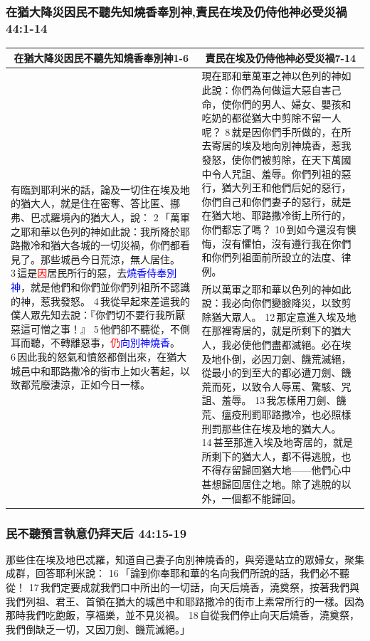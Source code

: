 \subsubsection{在猶大降災因民不聽先知燒香奉別神,責民在埃及仍侍他神必受災禍 44:1-14}
\begin{table}[H]
\centering
\begin{tabular}{p{6cm}|p{11.250cm}}\hline\hline
\multicolumn{1}{c|}{在猶大降災因民不聽先知燒香奉別神1-6}&\multicolumn{1}{c}{責民在埃及仍侍他神必受災禍7-14}\\\hline
\multirow{2}{6.26cm}{有臨到耶利米的話，論及一切住在埃及地的猶大人，就是住在密奪、答比匿、挪弗、巴忒羅境內的猶大人，說： 2 「萬軍之耶和華以色列的神如此說：我所降於耶路撒冷和猶大各城的一切災禍，你們都看見了。那些城邑今日荒涼，無人居住。 3 這是\textcolor{red}{因}居民所行的惡，去\textcolor{blue}{燒香侍奉別神}，就是他們和你們並你們列祖所不認識的神，惹我發怒。 4 我從早起來差遣我的僕人眾先知去說：『你們切不要行我所厭惡這可憎之事！』 5 他們卻不聽從，不側耳而聽，不轉離惡事，\textcolor{red}{仍}\textcolor{blue}{向別神燒香}。 6 因此我的怒氣和憤怒都倒出來，在猶大城邑中和耶路撒冷的街市上如火著起，以致都荒廢淒涼，正如今日一樣。}
&現在耶和華萬軍之神以色列的神如此說：你們為何做這大惡自害己命，使你們的男人、婦女、嬰孩和吃奶的都從猶大中剪除不留一人呢？ 8 就是因你們手所做的，在所去寄居的埃及地向別神燒香，惹我發怒，使你們被剪除，在天下萬國中令人咒詛、羞辱。你們列祖的惡行，猶大列王和他們后妃的惡行，你們自己和你們妻子的惡行，就是在猶大地、耶路撒冷街上所行的，你們都忘了嗎？ 10 到如今還沒有懊悔，沒有懼怕，沒有遵行我在你們和你們列祖面前所設立的法度、律例。\\\cline{2-2}
&所以萬軍之耶和華以色列的神如此說：我必向你們變臉降災，以致剪除猶大眾人。 12 那定意進入埃及地在那裡寄居的，就是所剩下的猶大人，我必使他們盡都滅絕。必在埃及地仆倒，必因刀劍、饑荒滅絕，從最小的到至大的都必遭刀劍、饑荒而死，以致令人辱罵、驚駭、咒詛、羞辱。 13 我怎樣用刀劍、饑荒、瘟疫刑罰耶路撒冷，也必照樣刑罰那些住在埃及地的猶大人。 14 甚至那進入埃及地寄居的，就是所剩下的猶大人，都不得逃脫，也不得存留歸回猶大地——他們心中甚想歸回居住之地。除了逃脫的以外，一個都不能歸回。\\\hline
\end{tabular}
\end{table}

\subsubsection{民不聽預言執意仍拜天后 44:15-19}
那些住在埃及地巴忒羅，知道自己妻子向別神燒香的，與旁邊站立的眾婦女，聚集成群，回答耶利米說： 16 「論到你奉耶和華的名向我們所說的話，我們必不聽從！ 17 我們定要成就我們口中所出的一切話，向天后燒香，澆奠祭，按著我們與我們列祖、君王、首領在猶大的城邑中和耶路撒冷的街市上素常所行的一樣。因為那時我們吃飽飯，享福樂，並不見災禍。 18 自從我們停止向天后燒香，澆奠祭，我們倒缺乏一切，又因刀劍、饑荒滅絕。」

